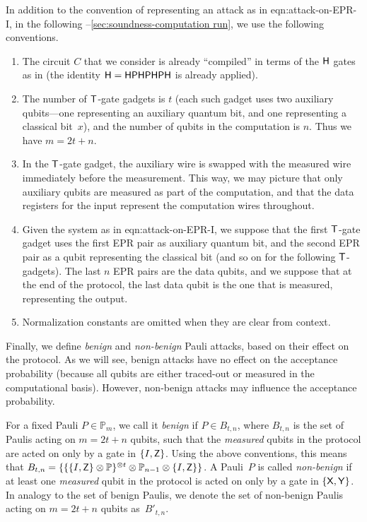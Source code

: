 \documentclass{toc}
\newcommand{\hgate}{{\sf H}}
\newcommand{\pgate}{{\sf P}}
\newcommand{\tgate}{{\sf T}}
\newcommand{\xgate}{{\sf X}}
\newcommand{\ygate}{{\sf Y}}
\newcommand{\zgate}{{\sf Z}}
\begin{document}
In addition to the convention of representing an attack as in  {eqn:attack-on-EPR-I},
in the following --\ref{sec:soundness-computation run}, we use the following conventions.%
%
\begin{enumerate}
\item The circuit $C$ that we consider is already ``compiled'' in terms of the $\hgate$ gates as in  (the identity $\hgate = \hgate \pgate \hgate \pgate \hgate \pgate\hgate$ is already applied).
\item The number of $\tgate$-gate gadgets is $t$ (each such gadget uses two auxiliary qubits---one representing an auxiliary quantum bit, and one representing a classical bit~$x$), and the number of qubits in the computation is $n$. %
    Thus we have $m=2t+n$.
     \item In the $\tgate$-gate gadget, the auxiliary wire is swapped with the measured wire immediately before the measurement. %
     This
      way, we may picture that only auxiliary qubits are measured as part of the computation, and that the data registers for the input  represent the computation wires throughout.
         \item  Given the system as in  {eqn:attack-on-EPR-I}, we suppose that the first $\tgate$-gate gadget uses the first EPR pair  as auxiliary quantum bit, and the second EPR pair as a qubit representing the classical bit (and so on for the following $\tgate$-gadgets). The last $n$ EPR pairs are the data qubits, and we suppose that at the end of the protocol, the last data qubit is the one that is measured, representing the output.

         \item Normalization constants are omitted when they are clear from context.
\end{enumerate}

Finally, we define \emph{benign} and \emph{non-benign} Pauli attacks, based on their effect on the protocol. %
%
%
As we will see,  benign attacks have no effect on the acceptance probability (because all qubits are either traced-out or measured in the computational basis). However, non-benign attacks may influence the acceptance probability.
\begin{definition}
   For a fixed Pauli $P \in \mathbb{P}_{m}$, we call it \emph{benign} if $P \in B_{t,n}$, where $B_{t,n}$ is the set of Paulis acting on $m=2t+n$ qubits, such that the \emph{measured} qubits in the protocol are acted on only by a gate in $\{I, \zgate\}$. Using the  above conventions, this means that $B_{t,n} = \{\{\{I, \zgate\}\otimes\mathbb{P}\}^{\otimes  t} \otimes \mathbb{P}_{n-1} \otimes   \{I, \zgate\}\}$. A Pauli~$P$ is called \emph{non-benign} if at least one \emph{measured} qubit in the protocol is acted on only by a gate in $\{\xgate, \ygate\}$. In analogy to the set of benign Paulis, we denote the set of non-benign Paulis acting on $m=2t+n$ qubits as~$B'_{t,n}$.
\end{definition}
\end{document}
